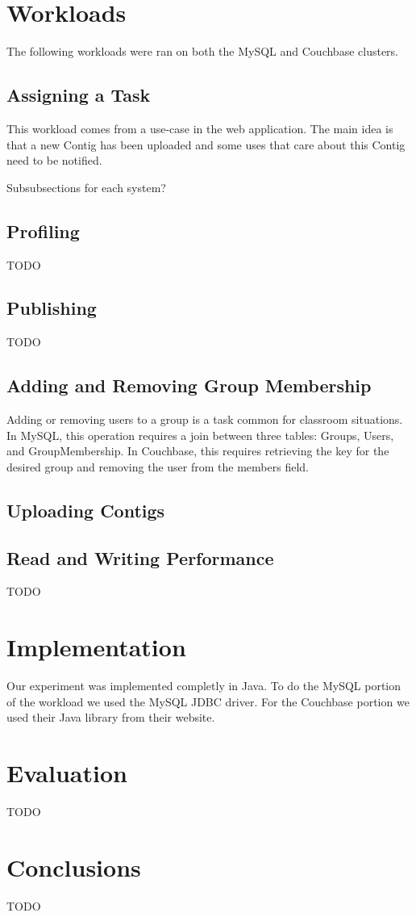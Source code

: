 \documentclass[]{IEEEtran}
\begin{document}
\section{Workloads}
The following workloads were ran on both the MySQL and Couchbase clusters.
\subsection{Assigning a Task}
This workload comes from a use-case in the web application. The main idea is that a new Contig has been uploaded and some uses that care about this Contig need to be notified. 

Subsubsections for each system?
\subsection{Profiling}
TODO
\subsection{Publishing}
TODO
\subsection{Adding and Removing Group Membership}
Adding or removing users to a group is a task common for classroom situations. In MySQL, this operation requires a join between three tables: Groups, Users, and GroupMembership. In Couchbase, this requires retrieving the key for the desired group and removing the user from the members field.
\subsection{Uploading Contigs}

\subsection{Read and Writing Performance}
TODO

\section{Implementation}
Our experiment was implemented completly in Java. To do the MySQL portion of the workload we used
the MySQL JDBC driver. For the Couchbase portion we used their Java library from their website.

\section{Evaluation}
TODO

\section{Conclusions}
TODO

% 
% 
\end{document}
